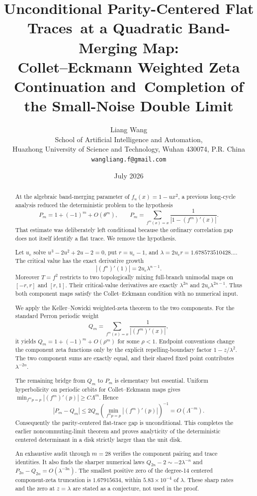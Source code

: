 \documentclass[11pt]{article}
\title{\textbf{Unconditional Parity-Centered Flat Traces}\
\textbf{at a Quadratic Band-Merging Map:}\\
\large Collet--Eckmann Weighted Zeta Continuation and\
Completion of the Small-Noise Double Limit}
\author{Liang Wang\\
\small School of Artificial Intelligence and Automation,\\[-0.2em]
\small Huazhong University of Science and Technology, Wuhan 430074, P.R. China\\
\small \texttt{wangliang.f@gmail.com}}
\date{July 2026}
\theoremstyle{definition}
\theoremstyle{remark}
\newcommand{\uc}{u_{\mathrm c}}
\begin{document}
\maketitle

\begin{abstract}
At the algebraic band-merging parameter of $f_u(x)=1-u x^2$, a previous
long-cycle analysis reduced the deterministic problem to the hypothesis
\[
 P_m=1+(-1)^m+O(\theta^m),
 \qquad
 P_m=\sum_{f^m(x)=x}\frac{1}{|1-(f^m)'(x)|}.
\]
That estimate was deliberately left conditional because the ordinary
correlation gap does not itself identify a flat trace.  We remove the
hypothesis.

Let $\uc$ solve $u^3-2u^2+2u-2=0$, put $r=\uc-1$, and
$\lambda=2\uc r=1.678573510428\ldots$.  The critical value has the exact
derivative growth
\[
 |(f^n)'(1)|=2\uc\lambda^{n-1}.
\]
Moreover $T=f^2$ restricts to two topologically mixing full-branch unimodal
maps on $[-r,r]$ and $[r,1]$.  Their critical-value derivatives are exactly
$\lambda^{2n}$ and $2\uc\lambda^{2n-1}$.  Thus both component maps satisfy the
Collet--Eckmann condition with no numerical input.

We apply the Keller--Nowicki weighted-zeta theorem to the two components.  For
the standard Perron periodic weight
\[
 Q_m=\sum_{f^m(x)=x}\frac{1}{|(f^m)'(x)|},
\]
it yields $Q_m=1+(-1)^m+O(\rho^m)$ for some $\rho<1$.  Endpoint conventions
change the component zeta functions only by the explicit repelling-boundary
factor $1-z/\lambda^2$.  The two component sums are exactly equal, and their
shared fixed point contributes $\lambda^{-2n}$.

The remaining bridge from $Q_m$ to $P_m$ is elementary but essential.
Uniform hyperbolicity on periodic orbits for Collet--Eckmann maps gives
$\min_{f^m p=p}|(f^m)'(p)|\ge C\Lambda^m$.  Hence
\[
 |P_m-Q_m|
 \le 2Q_m\left(\min_{f^m p=p}|(f^m)'(p)|\right)^{-1}
 =O(\Lambda^{-m}).
\]
Consequently the parity-centered flat-trace gap is unconditional.  This
completes the earlier noncommuting-limit theorem and proves analyticity of the
deterministic centered determinant in a disk strictly larger than the unit
disk.

An exhaustive audit through $m=28$ verifies the component pairing and trace
identities.  It also finds the sharper numerical laws
$Q_{2n}-2\sim-2\lambda^{-n}$ and
$P_{2n}-Q_{2n}=O(\lambda^{-3n})$.  The smallest positive zero of the degree-14
centered component-zeta truncation is $1.67915634$, within
$5.83\times10^{-4}$ of $\lambda$.  These sharp rates and the zero at
$z=\lambda$ are stated as a conjecture, not used in the proof.
\end{abstract}
\end{document}
